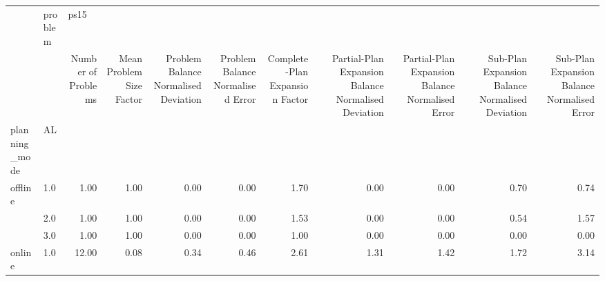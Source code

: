 \begin{tabular}{llrrrrrrrrr}
\toprule
       & problem & \multicolumn{9}{l}{ps15} \\
       & {} & Number of Problems & Mean Problem Size Factor & Problem Balance Normalised Deviation & Problem Balance Normalised Error & Complete-Plan Expansion Factor & Partial-Plan Expansion Balance Normalised Deviation & Partial-Plan Expansion Balance Normalised Error & Sub-Plan Expansion Balance Normalised Deviation & Sub-Plan Expansion Balance Normalised Error \\
planning\_mode & AL &                    &                          &                                      &                                  &                                &                                                     &                                                 &                                                 &                                             \\
\midrule
offline & 1.0 &               1.00 &                     1.00 &                                 0.00 &                             0.00 &                           1.70 &                                               0.00 &                                            0.00 &                                            0.70 &                                        0.74 \\
       & 2.0 &               1.00 &                     1.00 &                                 0.00 &                             0.00 &                           1.53 &                                               0.00 &                                            0.00 &                                            0.54 &                                        1.57 \\
       & 3.0 &               1.00 &                     1.00 &                                 0.00 &                             0.00 &                           1.00 &                                               0.00 &                                            0.00 &                                            0.00 &                                        0.00 \\
online & 1.0 &              12.00 &                     0.08 &                                 0.34 &                             0.46 &                           2.61 &                                               1.31 &                                            1.42 &                                            1.72 &                                        3.14 \\

\end{tabular}
